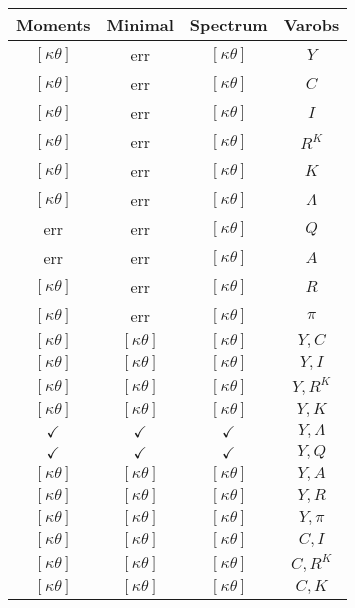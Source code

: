 \documentclass[a4paper,10pt]{article}
\begin{document}
\centering
\begin{longtable}{|c|c|c|c|}
\hline
Moments & Minimal & Spectrum & Varobs \\
\hline
$[\kappa \theta ]$ & err & $[\kappa \theta ]$ & ${Y}$ \\
\hline
$[\kappa \theta ]$ & err & $[\kappa \theta ]$ & ${C}$ \\
\hline
$[\kappa \theta ]$ & err & $[\kappa \theta ]$ & ${I}$ \\
\hline
$[\kappa \theta ]$ & err & $[\kappa \theta ]$ & ${R^{K}}$ \\
\hline
$[\kappa \theta ]$ & err & $[\kappa \theta ]$ & ${K}$ \\
\hline
$[\kappa \theta ]$ & err & $[\kappa \theta ]$ & ${\Lambda}$ \\
\hline
err & err & $[\kappa \theta ]$ & ${Q}$ \\
\hline
err & err & $[\kappa \theta ]$ & ${A}$ \\
\hline
$[\kappa \theta ]$ & err & $[\kappa \theta ]$ & ${R}$ \\
\hline
$[\kappa \theta ]$ & err & $[\kappa \theta ]$ & ${\pi}$ \\
\hline
$[\kappa \theta ]$ & $[\kappa \theta ]$ & $[\kappa \theta ]$ & ${Y},{C}$ \\
\hline
$[\kappa \theta ]$ & $[\kappa \theta ]$ & $[\kappa \theta ]$ & ${Y},{I}$ \\
\hline
$[\kappa \theta ]$ & $[\kappa \theta ]$ & $[\kappa \theta ]$ & ${Y},{R^{K}}$ \\
\hline
$[\kappa \theta ]$ & $[\kappa \theta ]$ & $[\kappa \theta ]$ & ${Y},{K}$ \\
\hline
$\checkmark$ & $\checkmark$ & $\checkmark$ & ${Y},{\Lambda}$ \\
\hline
$\checkmark$ & $\checkmark$ & $\checkmark$ & ${Y},{Q}$ \\
\hline
$[\kappa \theta ]$ & $[\kappa \theta ]$ & $[\kappa \theta ]$ & ${Y},{A}$ \\
\hline
$[\kappa \theta ]$ & $[\kappa \theta ]$ & $[\kappa \theta ]$ & ${Y},{R}$ \\
\hline
$[\kappa \theta ]$ & $[\kappa \theta ]$ & $[\kappa \theta ]$ & ${Y},{\pi}$ \\
\hline
$[\kappa \theta ]$ & $[\kappa \theta ]$ & $[\kappa \theta ]$ & ${C},{I}$ \\
\hline
$[\kappa \theta ]$ & $[\kappa \theta ]$ & $[\kappa \theta ]$ & ${C},{R^{K}}$ \\
\hline
$[\kappa \theta ]$ & $[\kappa \theta ]$ & $[\kappa \theta ]$ & ${C},{K}$ \\

\end{longtable}
\end{document}
